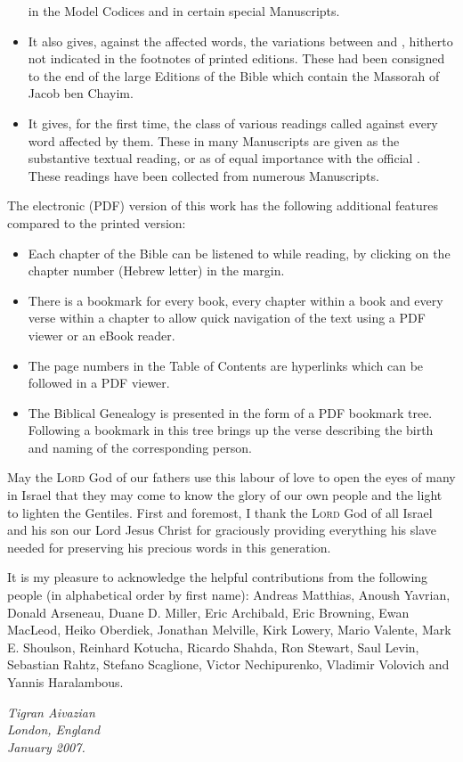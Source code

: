 \begin{itemize}
in the Model Codices and in certain special Manuscripts.
\item It also gives, against the affected words, the variations between
 and , hitherto not indicated
in the footnotes of printed editions.
These had been consigned to the end of the large Editions of the Bible which
contain the Massorah of Jacob ben Chayim.
\item It gives, for the first time, the  class of various
readings called  against every word affected by them.
These  in many Manuscripts are given as the substantive
textual reading, or as of equal importance with the official .
These readings have been collected from numerous Manuscripts.
\end{itemize}

The electronic (PDF) version of this work has the following additional
features compared to the printed version:
\begin{itemize}
\item Each chapter of the Bible can be listened to while reading, by
clicking on the chapter number (Hebrew letter) in the margin.
\item There is a bookmark for every book, every chapter within a book and
every verse within a chapter to allow quick navigation of the text using
a PDF viewer or an eBook reader.
\item The page numbers in the Table of Contents are hyperlinks which
can be followed in a PDF viewer.
\item The Biblical Genealogy is presented in the form of a PDF bookmark tree.
Following a bookmark in this tree brings up the verse describing the birth
and naming of the corresponding person.
\end{itemize}

May the \textsc{Lord} God of our fathers use this labour of love to open
the eyes of many in Israel that they may come to know the glory of our own
people and the light to lighten the Gentiles.
First and foremost, I thank the \textsc{Lord} God of all Israel and his son
our Lord Jesus Christ for graciously providing everything his slave needed
for preserving his precious words in this generation.

It is my pleasure to acknowledge the helpful contributions from the
following people (in alphabetical order by first name):
Andreas Matthias,
Anoush Yavrian,
Donald Arseneau,
Duane D. Miller,
Eric Archibald,
Eric Browning,
Ewan MacLeod,
Heiko Oberdiek,
Jonathan Melville,
Kirk Lowery,
Mario Valente,
Mark E. Shoulson,
Reinhard Kotucha,
Ricardo Shahda,
Ron Stewart,
Saul Levin,
Sebastian Rahtz,
Stefano Scaglione,
Victor Nechipurenko,
Vladimir Volovich and
Yannis Haralambous.

\begin{flushright}
\itshape
Tigran Aivazian\\
London, England\\
January 2007.
\end{flushright}
